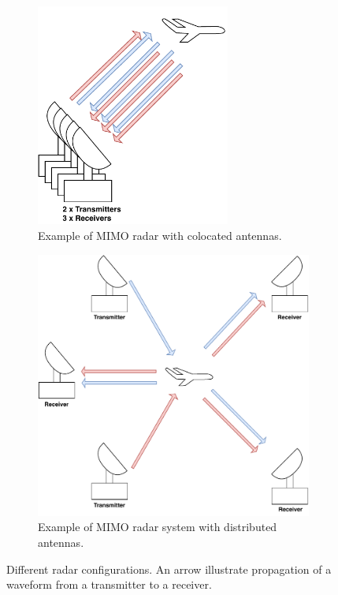 \documentclass[english, 12pt, a4paper, elec, utf8, a-1b, online]{aaltothesis}
\begin{document}
\begin{figure}[htb]
\begin{subfigure}[b]{0.45\textwidth}
        \includegraphics[width=0.7\textwidth]{figures/background/radar_types_colocated_MIMO.pdf}
        \caption{Example of MIMO radar with colocated antennas.}
        \label{fig:colocated_MIMO_radar}
    \end{subfigure}
    \hfill
    \begin{subfigure}[b]{0.45\textwidth}
        \includegraphics[width=\textwidth]{figures/background/radar_types_distributed_MIMO.pdf}
        \caption{Example of MIMO radar system with distributed antennas.}
        \label{fig:distributed_MIMO_radar}
    \end{subfigure}
    \caption{Different radar configurations. An arrow illustrate propagation of a waveform from a transmitter to a receiver.}
    \label{fig:radar_types}
\end{figure}
\end{document}
